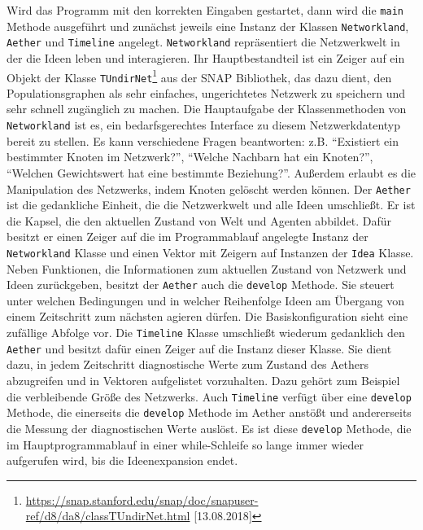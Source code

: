 \documentclass[openany,twoside,twocolumn]{book}
\let\rmarkdownfootnote\footnote%
\def\footnote{\protect\rmarkdownfootnote}
\begin{document}
Wird das Programm mit den korrekten Eingaben gestartet, dann wird die \texttt{main} Methode ausgeführt und zunächst jeweils eine Instanz der Klassen \texttt{Networkland}, \texttt{Aether} und \texttt{Timeline} angelegt. \texttt{Networkland} repräsentiert die Netzwerkwelt in der die Ideen leben und interagieren. Ihr Hauptbestandteil ist ein Zeiger auf ein Objekt der Klasse \texttt{TUndirNet}\footnote{\url{https://snap.stanford.edu/snap/doc/snapuser-ref/d8/da8/classTUndirNet.html} {[}13.08.2018{]}} aus der SNAP Bibliothek, das dazu dient, den Populationsgraphen als sehr einfaches, ungerichtetes Netzwerk zu speichern und sehr schnell zugänglich zu machen. Die Hauptaufgabe der Klassenmethoden von \texttt{Networkland} ist es, ein bedarfsgerechtes Interface zu diesem Netzwerkdatentyp bereit zu stellen. Es kann verschiedene Fragen beantworten: z.B. ``Existiert ein bestimmter Knoten im Netzwerk?'', ``Welche Nachbarn hat ein Knoten?'', ``Welchen Gewichtswert hat eine bestimmte Beziehung?''. Außerdem erlaubt es die Manipulation des Netzwerks, indem Knoten gelöscht werden können. Der \texttt{Aether} ist die gedankliche Einheit, die die Netzwerkwelt und alle Ideen umschließt. Er ist die Kapsel, die den aktuellen Zustand von Welt und Agenten abbildet. Dafür besitzt er einen Zeiger auf die im Programmablauf angelegte Instanz der \texttt{Networkland} Klasse und einen Vektor mit Zeigern auf Instanzen der \texttt{Idea} Klasse. Neben Funktionen, die Informationen zum aktuellen Zustand von Netzwerk und Ideen zurückgeben, besitzt der \texttt{Aether} auch die \texttt{develop} Methode. Sie steuert unter welchen Bedingungen und in welcher Reihenfolge Ideen am Übergang von einem Zeitschritt zum nächsten agieren dürfen. Die Basiskonfiguration sieht eine zufällige Abfolge vor. Die \texttt{Timeline} Klasse umschließt wiederum gedanklich den \texttt{Aether} und besitzt dafür einen Zeiger auf die Instanz dieser Klasse. Sie dient dazu, in jedem Zeitschritt diagnostische Werte zum Zustand des Aethers abzugreifen und in Vektoren aufgelistet vorzuhalten. Dazu gehört zum Beispiel die verbleibende Größe des Netzwerks. Auch \texttt{Timeline} verfügt über eine \texttt{develop} Methode, die einerseits die \texttt{develop} Methode im Aether anstößt und andererseits die Messung der diagnostischen Werte auslöst. Es ist diese \texttt{develop} Methode, die im Hauptprogrammablauf in einer while-Schleife so lange immer wieder aufgerufen wird, bis die Ideenexpansion endet.
\end{document}
